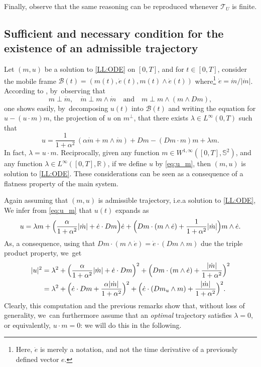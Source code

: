 \documentclass[10pt]{amsart}
\newcommand{\ie}{i.e.}
\theoremstyle{definition}
\begin{document}
Finally, observe that the same reasoning can be reproduced whenever $\mathcal{T}_U$ is finite.
\setcounter{theorem}{9}
\subsection{Sufficient and necessary condition for the existence of an admissible trajectory}

Let $(m,u)$ be a solution to \eqref{LL:ODE} on $[0,T]$, and for $t \in [0,T]$, consider the mobile frame $\mathcal{B}(t)=(m(t),\dot e(t),m(t)\wedge \dot e(t))$ where\footnote{Here, $\dot e$ is merely a notation, and not the time derivative of a previously defined vector $e$.} $\dot{e}=\dot{m}/|\dot{m}|$. According to \cite{alouges2009magnetization}, by~observing that
\[
m \perp \dot m, \quad \dot m \perp m \wedge \dot m \quad \text{and}\quad m \perp m \wedge (m\wedge Dm),
\]
one shows easily, by~decomposing $u(t)$ into $\mathcal{B}(t)$ and writing the equation for \hbox{$u - (u \cdot m) m$}, the projection of $u$ on $m^\perp$, that there exists $\lambda\in L^\infty (0,T)$ such that
\begin{equation} \label{eq:u_m}
u = \frac{1}{1+\alpha^2}\,(\alpha \dot m + m \wedge \dot m)+Dm-(Dm\cdot m)m+\lambda m.
\end{equation}
In fact, $\lambda = u\cdot m$. Reciprocally, given any function $m \in W^{1,\infty}([0,T],\mathbb S^2)$, and any function $\lambda \in L^\infty([0,T],\mathbb R)$, if we define $u$ by \eqref{eq:u_m}, then $(m,u)$ is solution to \eqref{LL:ODE}. These considerations can be seen as a consequence of a flatness property of the main system.

Again assuming that $(m,u)$ is admissible trajectory, \ie a solution to \eqref{LL:ODE}, We infer from \eqref{eq:u_m} that $u(t)$ expands as
\begin{equation}\label{eq:uexpand}
u=\lambda m +\Bigl(\frac{\alpha}{1+\alpha^2}|\dot m|+\dot e\cdot Dm \Bigr)\dot e+\Bigl(Dm \cdot (m \wedge \dot e)+\frac{1}{1+\alpha^2}|\dot m|\Bigr)m \wedge \dot e.
\end{equation}
As, a consequence, using that $Dm \cdot (m \wedge \dot e)=\dot e\cdot (Dm \wedge m)$ due the triple product property, we~get
\begin{align*}
|u|^2 &= \lambda^2+\Bigl(\frac{\alpha}{1+\alpha^2}|\dot m|+\dot e\cdot Dm\Bigr)^2+\Bigl(Dm\cdot (m\wedge \dot e)+\frac{|\dot m|}{1+\alpha^2}\Bigr)^2\\
&= \lambda^2+\Bigl(\dot e\cdot Dm+\frac{\alpha|\dot m|}{1+\alpha^2}\Bigr)^2+\Bigl(\dot e\cdot (Dm_u\wedge m)+\frac{|\dot m|}{1+\alpha^2}\Bigr)^2.
\end{align*}
Clearly, this computation and the previous remarks show that, without loss of generality, we~can furthermore assume that an \emph{optimal} trajectory satisfies $\lambda=0$, or equivalently, $u \cdot m =0$: we will do this in the following.
\end{document}
